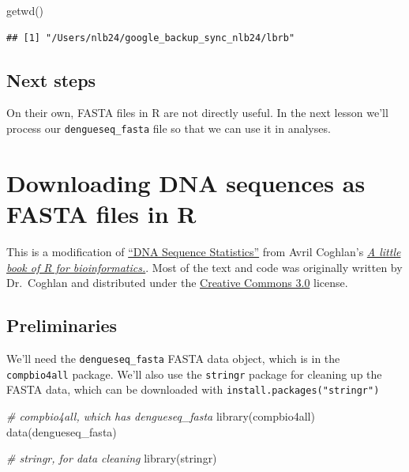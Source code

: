 \documentclass[
]{book}
\newenvironment{Shaded}{\begin{snugshade}}{\end{snugshade}}
\newcommand{\CommentTok}[1]{\textcolor[rgb]{0.56,0.35,0.01}{\textit{#1}}}
\newcommand{\FunctionTok}[1]{\textcolor[rgb]{0.00,0.00,0.00}{#1}}
\newcommand{\NormalTok}[1]{#1}
\begin{document}
\begin{Shaded}
\begin{Highlighting}[]
\FunctionTok{getwd}\NormalTok{()}
\end{Highlighting}
\end{Shaded}

\begin{verbatim}
## [1] "/Users/nlb24/google_backup_sync_nlb24/lbrb"
\end{verbatim}

\hypertarget{next-steps}{%
\section{Next steps}\label{next-steps}}

On their own, FASTA files in R are not directly useful. In the next lesson we'll process our \texttt{dengueseq\_fasta} file so that we can use it in analyses.

\hypertarget{downloading-dna-sequences-as-fasta-files-in-r-1}{%
\chapter{Downloading DNA sequences as FASTA files in R}\label{downloading-dna-sequences-as-fasta-files-in-r-1}}

This is a modification of \href{https://a-little-book-of-r-for-bioinformatics.readthedocs.io/en/latest/src/chapter1.html}{``DNA Sequence Statistics''} from Avril Coghlan's \href{https://a-little-book-of-r-for-bioinformatics.readthedocs.io/en/latest/index.html}{\emph{A little book of R for bioinformatics.}}. Most of the text and code was originally written by Dr.~Coghlan and distributed under the \href{https://creativecommons.org/licenses/by/3.0/us/}{Creative Commons 3.0} license.

\hypertarget{preliminaries-2}{%
\section{Preliminaries}\label{preliminaries-2}}

We'll need the \texttt{dengueseq\_fasta} FASTA data object, which is in the \texttt{compbio4all} package. We'll also use the \texttt{stringr} package for cleaning up the FASTA data, which can be downloaded with \texttt{install.packages("stringr")}

\begin{Shaded}
\begin{Highlighting}[]
\CommentTok{\# compbio4all, which has dengueseq\_fasta}
\FunctionTok{library}\NormalTok{(compbio4all)}
\FunctionTok{data}\NormalTok{(dengueseq\_fasta)}

\CommentTok{\# stringr, for data cleaning}
\FunctionTok{library}\NormalTok{(stringr)}
\end{Highlighting}
\end{Shaded}
\end{document}
